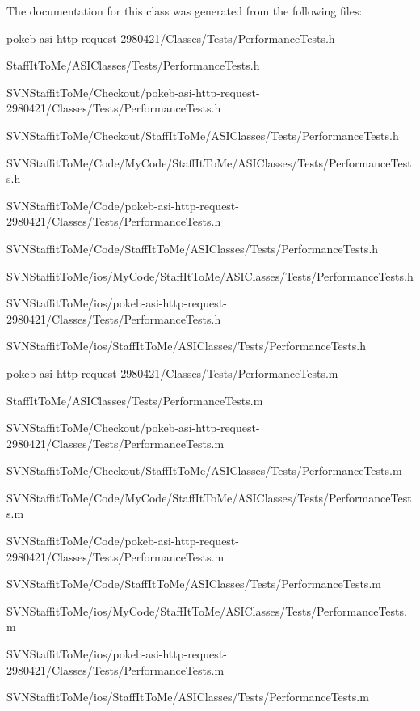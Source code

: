 \-The documentation for this class was generated from the following files\-:\begin{DoxyCompactItemize}
\item 
pokeb-\/asi-\/http-\/request-\/2980421/\-Classes/\-Tests/\-Performance\-Tests.\-h\item 
\-Staff\-It\-To\-Me/\-A\-S\-I\-Classes/\-Tests/\-Performance\-Tests.\-h\item 
\-S\-V\-N\-Staffit\-To\-Me/\-Checkout/pokeb-\/asi-\/http-\/request-\/2980421/\-Classes/\-Tests/\-Performance\-Tests.\-h\item 
\-S\-V\-N\-Staffit\-To\-Me/\-Checkout/\-Staff\-It\-To\-Me/\-A\-S\-I\-Classes/\-Tests/\-Performance\-Tests.\-h\item 
\-S\-V\-N\-Staffit\-To\-Me/\-Code/\-My\-Code/\-Staff\-It\-To\-Me/\-A\-S\-I\-Classes/\-Tests/\-Performance\-Tests.\-h\item 
\-S\-V\-N\-Staffit\-To\-Me/\-Code/pokeb-\/asi-\/http-\/request-\/2980421/\-Classes/\-Tests/\-Performance\-Tests.\-h\item 
\-S\-V\-N\-Staffit\-To\-Me/\-Code/\-Staff\-It\-To\-Me/\-A\-S\-I\-Classes/\-Tests/\-Performance\-Tests.\-h\item 
\-S\-V\-N\-Staffit\-To\-Me/ios/\-My\-Code/\-Staff\-It\-To\-Me/\-A\-S\-I\-Classes/\-Tests/\-Performance\-Tests.\-h\item 
\-S\-V\-N\-Staffit\-To\-Me/ios/pokeb-\/asi-\/http-\/request-\/2980421/\-Classes/\-Tests/\-Performance\-Tests.\-h\item 
\-S\-V\-N\-Staffit\-To\-Me/ios/\-Staff\-It\-To\-Me/\-A\-S\-I\-Classes/\-Tests/\-Performance\-Tests.\-h\item 
pokeb-\/asi-\/http-\/request-\/2980421/\-Classes/\-Tests/\-Performance\-Tests.\-m\item 
\-Staff\-It\-To\-Me/\-A\-S\-I\-Classes/\-Tests/\-Performance\-Tests.\-m\item 
\-S\-V\-N\-Staffit\-To\-Me/\-Checkout/pokeb-\/asi-\/http-\/request-\/2980421/\-Classes/\-Tests/\-Performance\-Tests.\-m\item 
\-S\-V\-N\-Staffit\-To\-Me/\-Checkout/\-Staff\-It\-To\-Me/\-A\-S\-I\-Classes/\-Tests/\-Performance\-Tests.\-m\item 
\-S\-V\-N\-Staffit\-To\-Me/\-Code/\-My\-Code/\-Staff\-It\-To\-Me/\-A\-S\-I\-Classes/\-Tests/\-Performance\-Tests.\-m\item 
\-S\-V\-N\-Staffit\-To\-Me/\-Code/pokeb-\/asi-\/http-\/request-\/2980421/\-Classes/\-Tests/\-Performance\-Tests.\-m\item 
\-S\-V\-N\-Staffit\-To\-Me/\-Code/\-Staff\-It\-To\-Me/\-A\-S\-I\-Classes/\-Tests/\-Performance\-Tests.\-m\item 
\-S\-V\-N\-Staffit\-To\-Me/ios/\-My\-Code/\-Staff\-It\-To\-Me/\-A\-S\-I\-Classes/\-Tests/\-Performance\-Tests.\-m\item 
\-S\-V\-N\-Staffit\-To\-Me/ios/pokeb-\/asi-\/http-\/request-\/2980421/\-Classes/\-Tests/\-Performance\-Tests.\-m\item 
\-S\-V\-N\-Staffit\-To\-Me/ios/\-Staff\-It\-To\-Me/\-A\-S\-I\-Classes/\-Tests/\-Performance\-Tests.\-m\end{DoxyCompactItemize}
